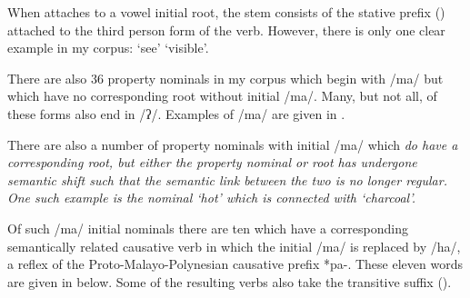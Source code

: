 When  attaches to a vowel initial root,
the stem consists of the stative prefix  ()
attached to the third person form of the verb.
However, there is only one clear example in my corpus:
 `see' {\ra}  `visible'.

There are also 36 property nominals in my corpus which
begin with /ma/ but which have no corresponding root without initial /ma/.
Many, but not all, of these forms also end in /ʔ/.
Examples of /ma/ are given in .

\begin{exe}
	\label{ex:FroAdjPre}
\end{exe}

There are also a number of property nominals with initial /ma/
which \it{do} have a corresponding root,
but either the property nominal or root has undergone semantic shift
such that the semantic link between the two is no longer regular.
One such example is the nominal  `hot'
which is connected with  `charcoal'.

Of such /ma/ initial nominals there are ten which have a corresponding 
semantically related causative verb in which the initial /ma/ is replaced by /ha/,
a reflex of the Proto-Malayo-Polynesian causative prefix *pa-.
These eleven words are given in  below.
Some of the resulting verbs also take the transitive suffix  ().

